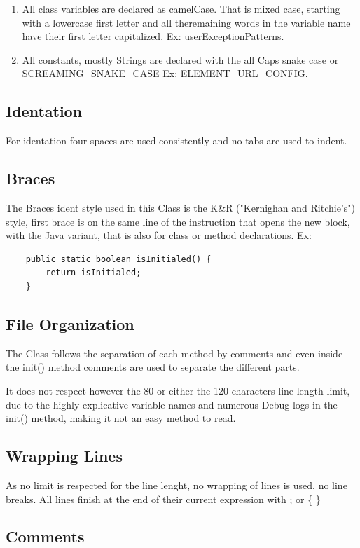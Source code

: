 \documentclass[a4paper]{article}
\begin{document}
\begin{enumerate}
\item All class variables are declared as camelCase. That is mixed case, starting with a lowercase first letter and all theremaining words in the variable name have their first letter capitalized. Ex: \ttfamily userExceptionPatterns\rmfamily.

\item All constants, mostly Strings are declared with the all Caps snake case or \ttfamily SCREAMING\_SNAKE\_CASE \rmfamily Ex: \ttfamily ELEMENT\_URL\_CONFIG\rmfamily.
\end{enumerate}
\subsection{Identation}
For identation four spaces are used consistently and no tabs are used to indent.

\subsection{Braces}
The Braces ident style used in this Class is the  K\&R ("Kernighan and Ritchie's") style, first brace is on the same line of the instruction that opens the new block, with the Java variant, that is also for class or method declarations. Ex:
\begin{verbatim}   
    public static boolean isInitialed() {
        return isInitialed;
    }
\end{verbatim}
\newpage

\subsection{File Organization}
The Class follows the separation of each method by comments and even inside the \ttfamily init() \rmfamily method comments are used to separate the different parts.\par 
It does not respect however the 80 or either the 120 characters line length limit, due to the highly explicative variable names and numerous Debug logs in the \ttfamily init() \rmfamily method, making it not an easy method to read. 
\subsection{Wrapping Lines}
As no limit is respected for the line lenght, no wrapping of lines is used, no line breaks. All lines finish at the end of their current expression with \ttfamily ; \rmfamily or \ttfamily \{ \} \rmfamily 
\subsection{Comments}
\end{document}

